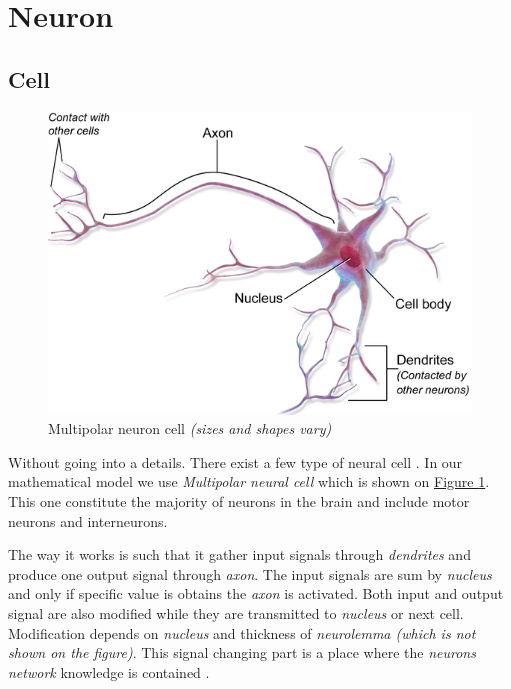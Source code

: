 \section{Neuron}

\subsection{Cell}

\begin{figure}[!h]
    \centering
    \includegraphics[scale=1]{Media/MultipolarNeuron.png}
    \caption[Multipolar neuron cell]{Multipolar neuron cell \textit{(sizes and shapes vary)} \cite{neuronPNG}}
    \label{fig:MultipolarNeuronCell}
\end{figure}

Without going into a details. There exist a few type of neural cell \cite{manyNeuronVersions}. In our mathematical model we use \textit{Multipolar neural cell} which is shown on \hyperref[fig:MultipolarNeuronCell]{Figure \ref{fig:MultipolarNeuronCell}}. This one constitute the majority of neurons in the brain and include motor neurons and interneurons.

The way it works is such that it gather input signals through \textit{dendrites} and produce one output signal through \textit{axon}. The input signals are sum by \textit{nucleus} and only if specific value is obtains the \textit{axon} is activated. Both input and output signal are also modified while they are transmitted to \textit{nucleus} or next cell. Modification depends on \textit{nucleus} and thickness of \textit{neurolemma (which is not shown on the figure)}. This signal changing part is a place where the \textit{neurons network} knowledge is contained \cite{mlpPawelRosczak}.

